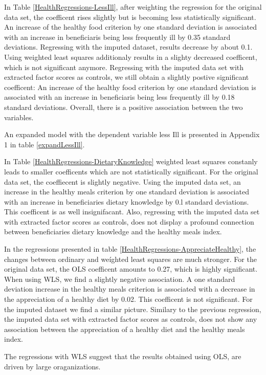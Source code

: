 \documentclass[12pt, a4paper, titlepage]{article}\usepackage[]{graphicx}\usepackage[]{color}
\begin{document}
In Table \ref{HealthRegressions-LessIll}, after weighting the regression for the original data set, the coefficent rises slightly but is becoming less statistically significant. An increase of the healthy food criterion by one standard deviation is associated with an increase in beneficiaris being less frequently ill by 0.35 standard deviations. Regressing with the imputed dataset, results decrease by about 0.1. Using weighted least squares additionaly results in a slighty decreased coefficent, which is not significant anymore. Regressing with the imputed data set with extracted factor scores as controls, we still obtain a slightly postive significant coefficent: An increase of the healthy food criterion by one standard deviation is associated with an increase in beneficiaris being less frequently ill by 0.18 standard deviations. Overall, there is a positive association between the two variables.    

An expanded model with the dependent variable less Ill is presented in Appendix 1 in table \ref{expandLessIll}. 

In Table \ref{HealthRegressions-DietaryKnowledge} weighted least squares constanly leads to smaller coefficents which are not statistically significant. For the original data set, the coeffiecent is slightly negative. Using the imputed data set, an increase in the healthy meals criterion by one standard deviation is associated with an increase in beneficiaries dietary knowledge by 0.l standard deviations. This coefficent is as well insignifacant. Also, regressing with the imputed data set with extracted factor scores as controls, does not display a profound connection between beneficiaries dietary knowledge and the healthy meals index.  

In the regressions presented in table \ref{HealthRegressions-AppreciateHealthy}, the changes between ordinary and weíghted least squares are much stronger. For the original data set, the OLS coefficent amounts to 0.27, which is highly significant. When using WLS, we find a slightly negative association. A one standard deviation increase in the healthy meals criterion is associated with a decrease in the appreciation of a healthy diet by 0.02. This coefficent is not significant. For the imputed dataset we find a similar picture. Similary to the previous regression, the imputed data set with extracted factor scores as controls, does not show any association between the appreciation of a healthy diet and the healthy meals index. 

The regressions with WLS suggest that the results obtained using OLS, are driven by large oraganizations.
\end{document}
